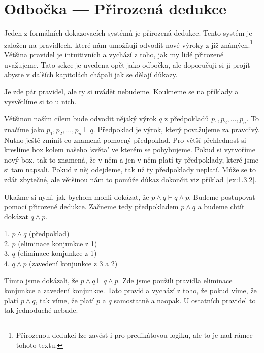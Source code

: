 \section{Odbočka --- Přirozená dedukce}
Jeden z formálních dokazovacích systémů je přirozená dedukce. Tento systém je založen na pravidlech, které nám umožňují odvodit nové výroky z již známých.\footnote{Přirozenou dedukci lze zavést i pro predikátovou logiku, ale to je nad rámec tohoto textu.} Většina pravidel je intuitivních a vychází z toho, jak my lidé přirozeně uvažujeme. Tato sekce je uvedena opět jako odbočka, ale doporučuji si ji projít abyste v dalších kapitolách chápali jak se dělají důkazy.

Je zde pár pravidel, ale ty si uvádět nebudeme. Koukneme se na příklady a vysvětlíme si to u nich.

\begin{definitionbox}
  Většinou naším cílem bude odvodit nějaký výrok $q$ z předpokladů $p_1, p_2, \ldots, p_n$. To značíme jako $p_1, p_2, \ldots, p_n \vdash q$.  Předpoklad je výrok, který považujeme za pravdivý. Nutno ještě zmínit co znamená pomocný předpoklad. Pro větší přehlednost si kreslíme box kolem našeho `světa' ve kterém se pohybujeme. Pokud si vytvoříme nový box, tak to znamená, že v něm a jen v něm platí ty předpoklady, které jsme si tam napsali. Pokud z něj odejdeme, tak už ty předpoklady neplatí. Může se to zdát zbytečné, ale většinou nám to pomůže důkaz dokončit viz příklad~\ref{ex:1.3.2}.
\end{definitionbox}

\begin{example}
  Ukažme si nyní, jak bychom mohli dokázat, že $p \land q \vdash q \land p$. Budeme postupovat pomocí přirozené dedukce. Začneme tedy předpokladem $p \land q$ a budeme chtít dokázat $q \land p$. 
  \begin{proofbox}
    1. $p \land q$ (předpoklad) \\
    2. $p$ (eliminace konjunkce z 1) \\
    3. $q$ (eliminace konjunkce z 1) \\
    4. $q \land p$ (zavedení konjunkce z 3 a 2)
  \end{proofbox}
  Tímto jsme dokázali, že $p \land q \vdash q \land p$. Zde jsme použili pravidla eliminace konjunkce a zavedení konjunkce. Tato pravidla vychází z toho, že pokud víme, že platí $p \land q$, tak víme, že platí $p$ a $q$ samostatně a naopak. U ostatních pravidel to tak jednoduché nebude.
\end{example}

